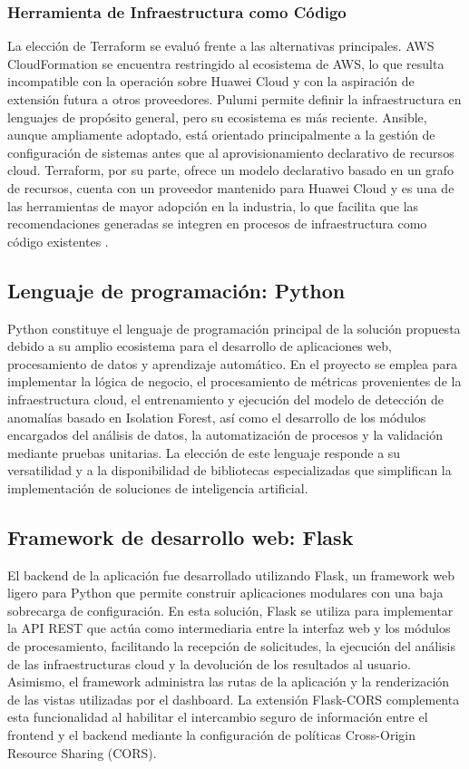 \subsubsection{Herramienta de Infraestructura como Código}

La elección de Terraform se evaluó frente a las alternativas principales. AWS CloudFormation se encuentra restringido al ecosistema de AWS, lo que resulta incompatible con la operación sobre Huawei Cloud y con la aspiración de extensión futura a otros proveedores. Pulumi permite definir la infraestructura en lenguajes de propósito general, pero su ecosistema es más reciente. Ansible, aunque ampliamente adoptado, está orientado principalmente a la gestión de configuración de sistemas antes que al aprovisionamiento declarativo de recursos cloud. Terraform, por su parte, ofrece un modelo declarativo basado en un grafo de recursos, cuenta con un proveedor mantenido para Huawei Cloud y es una de las herramientas de mayor adopción en la industria, lo que facilita que las recomendaciones generadas se integren en procesos de infraestructura como código existentes \parencite{HashiCorp2026, Morris2016}.

\subsection{Lenguaje de programación: Python}

Python constituye el lenguaje de programación principal de la solución
propuesta debido a su amplio ecosistema para el desarrollo de
aplicaciones web, procesamiento de datos y aprendizaje automático. En el
proyecto se emplea para implementar la lógica de negocio, el
procesamiento de métricas provenientes de la infraestructura cloud, el
entrenamiento y ejecución del modelo de detección de anomalías basado en
Isolation Forest, así como el desarrollo de los módulos encargados del
análisis de datos, la automatización de procesos y la validación
mediante pruebas unitarias. La elección de este lenguaje responde a su
versatilidad y a la disponibilidad de bibliotecas especializadas que
simplifican la implementación de soluciones de inteligencia artificial.

\subsection{Framework de desarrollo web: Flask}

El backend de la aplicación fue desarrollado utilizando Flask, un
framework web ligero para Python que permite construir aplicaciones
modulares con una baja sobrecarga de configuración. En esta solución,
Flask se utiliza para implementar la API REST que actúa como
intermediaria entre la interfaz web y los módulos de procesamiento,
facilitando la recepción de solicitudes, la ejecución del análisis de
las infraestructuras cloud y la devolución de los resultados al usuario.
Asimismo, el framework administra las rutas de la aplicación y la
renderización de las vistas utilizadas por el dashboard. La extensión
Flask-CORS complementa esta funcionalidad al habilitar el intercambio
seguro de información entre el frontend y el backend mediante la
configuración de políticas Cross-Origin Resource Sharing (CORS).

